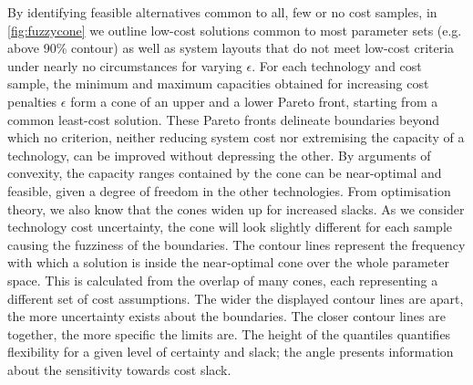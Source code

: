 By identifying feasible alternatives common to all, few or no cost samples, in
\cref{fig:fuzzycone} we outline low-cost solutions common to most parameter sets
(e.g. above 90\% contour) as well as system layouts that do not meet low-cost
criteria under nearly no circumstances for varying $\epsilon$. For each
technology and cost sample, the minimum and maximum capacities obtained for
increasing cost penalties $\epsilon$ form a cone of an upper and a lower Pareto
front, starting from a common least-cost solution. These Pareto fronts delineate
boundaries beyond which no criterion, neither reducing system cost nor
extremising the capacity of a technology, can be improved without depressing the
other. By arguments of convexity, the capacity ranges contained by the cone can
be near-optimal and feasible, given a degree of freedom in the other
technologies. From optimisation theory, we also know that the cones widen up for
increased slacks. As we consider technology cost uncertainty, the cone will look
slightly different for each sample causing the fuzziness of the boundaries. The
contour lines represent the frequency with which a solution is inside the near-optimal cone
over the whole parameter space. This is calculated from the overlap of many
cones, each representing a different set of cost assumptions. The wider the displayed
contour lines are apart, the more uncertainty exists about the boundaries. The
closer contour lines are together, the more specific the limits are. The height
of the quantiles quantifies flexibility for a given level of certainty and
slack; the angle presents information about the sensitivity towards cost slack.

